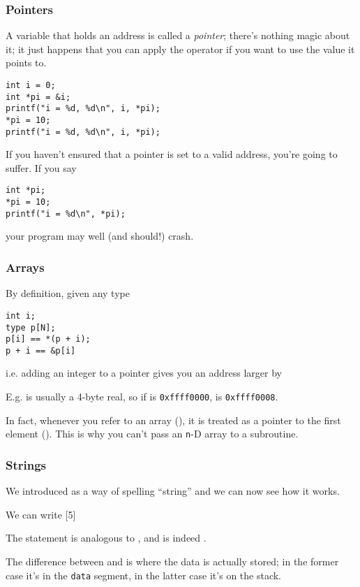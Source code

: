 \documentclass[10pt, t]{beamer}
\begin{document}
\begin{frame}[fragile]
\frametitle{Pointers}
\label{sec-5_1_11}


A variable that holds an address is called a \emph{pointer}; there's nothing magic about it;  it just happens 
that you can apply the \code{*} operator if you want to use the value it points to.

\pause
\begin{verbatim}
int i = 0;
int *pi = &i;
printf("i = %d, %d\n", i, *pi);
*pi = 10;
printf("i = %d, %d\n", i, *pi);
\end{verbatim}

\pause
If you haven't ensured that a pointer is set to a valid address, you're going to suffer.  If you say
\begin{verbatim}
int *pi;
*pi = 10;
printf("i = %d\n", *pi);
\end{verbatim}
your program may well (and should!) crash.
\end{frame}
\begin{frame}[fragile]
\frametitle{Arrays}
\label{sec-5_1_12}

By definition, given any type 
\begin{verbatim}
int i;
type p[N];
p[i] == *(p + i);
p + i == &p[i]
\end{verbatim}
\pause
i.e. adding an integer to a pointer gives you an address larger by 
\pause

E.g.  is usually a 4-byte real, so if  is \texttt{0xffff0000},  is \texttt{0xffff0008}.

\pause
In fact, whenever you refer to an array (), it is treated as a pointer to the first element (). 
This is why you can't pass an \texttt{n}-D array to a subroutine.
\end{frame}
\begin{frame}
\frametitle{Strings}
\label{sec-5_1_13}


We introduced  as a way of spelling ``string'' and we can now see how it works.

We can write  [5]
\pause

The statement  is analogous to , 
and  is indeed .
\pause

The difference between  and  is where the data is
actually stored; in the former case it's in the \texttt{data} segment, in the latter case it's on the stack.
\end{frame}
\end{document}
